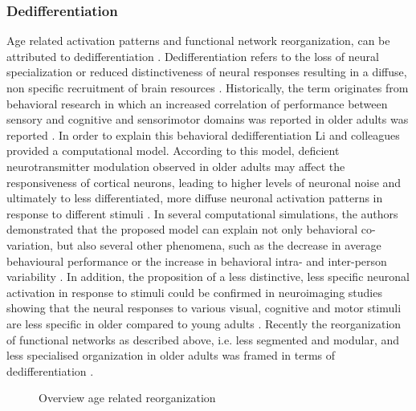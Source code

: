 \subsubsection{Dedifferentiation}
\label{theory:aging:dedif}
Age related activation patterns and functional network reorganization, can be attributed to dedifferentiation \cite{Grady2012}. Dedifferentiation refers to the loss of neural specialization or reduced distinctiveness of neural responses resulting in a diffuse, non specific recruitment of brain resources \cite{Koen2019}. Historically, the term originates from behavioral research in which an increased correlation of performance between sensory and cognitive and sensorimotor domains was reported in older adults was reported \cite{Baltes1997,Li2002}. In order to explain this behavioral dedifferentiation Li and colleagues \cite{Li2001, Li2002} provided a computational model. According to this model, deficient neurotransmitter modulation observed in older adults may affect the responsiveness of cortical neurons, leading to higher levels of neuronal noise and ultimately to less differentiated, more diffuse neuronal activation patterns in response to different stimuli \cite{Li2001,Li2002}. In several computational simulations, the authors demonstrated that the proposed model can explain not only behavioral co-variation, but also several other phenomena, such as the decrease in average behavioural performance or the increase in behavioral intra- and inter-person variability \cite{Li2000,Li2002}. In addition, the proposition of a less distinctive, less specific neuronal activation in response to stimuli could be confirmed in neuroimaging studies showing that the neural responses to various visual, cognitive and motor stimuli are less specific in older compared to young adults \cite{Tucker2019, Koen2019,Carb2011}. Recently the reorganization of functional networks as described above, i.e. less segmented and modular, and less specialised organization in older adults was framed in terms of dedifferentiation \cite{Deery2023, Koen2019, Sala-Llonch2015}.

\begin{figure*}[h]
  \caption{Overview age related reorganization}
  \label{fig1:ml_types}
\end{figure*}

